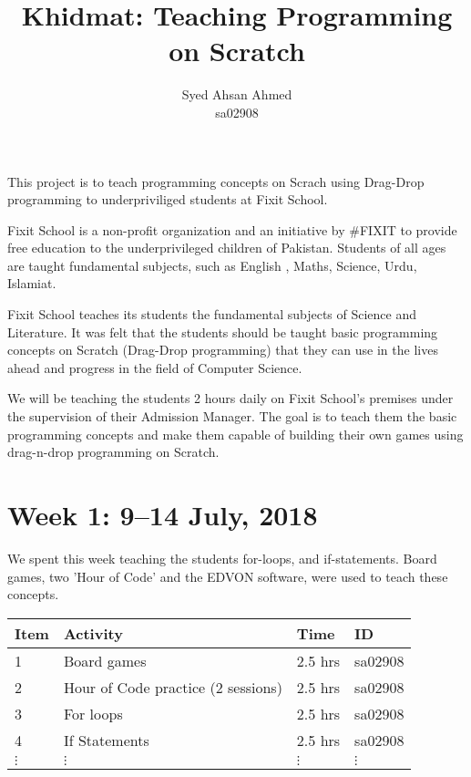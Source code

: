 \documentclass{article}
\title {Khidmat: Teaching Programming on Scratch}
\author{
  Syed Ahsan Ahmed\\ sa02908
}
\date{}
\begin{document}
\maketitle

This project is to teach programming concepts on Scrach using Drag-Drop programming to underpriviliged students at Fixit School.

Fixit School is a non-profit organization and an initiative by #FIXIT to provide free education to the underprivileged children of Pakistan. Students of all ages are taught fundamental subjects, such as English , Maths, Science, Urdu, Islamiat. 

Fixit School teaches its students the fundamental subjects of Science and Literature. It was felt that the students should be taught basic programming concepts on Scratch (Drag-Drop programming) that they can use in the lives ahead and progress in the field of Computer Science.

We will be teaching the students 2 hours daily on Fixit School's premises under the supervision of their Admission Manager. The goal is to teach them the basic programming concepts and make them capable of building their own games using drag-n-drop programming on Scratch.

\newpage %
\section*{Week 1: 9--14 July, 2018}

We spent this week teaching the students for-loops, and if-statements. Board games, two 'Hour of Code' and the EDVON software, were used to teach these concepts.

\begin{tabular}{|l|l|l|l|}
  \hline
  Item 	& Activity & Time & ID \\\hline\hline
  1	& Board games & 2.5 hrs & sa02908 \\\hline
  2	& Hour of Code practice (2 sessions) & 2.5 hrs & sa02908 \\\hline
  3	& For loops & 2.5 hrs & sa02908 \\\hline
  4 & If Statements & 2.5 hrs & sa02908 \\\hline
  $\vdots$ & $\vdots$ & $\vdots$ & $\vdots$ \\\hline
\end{tabular}
\end{document}
